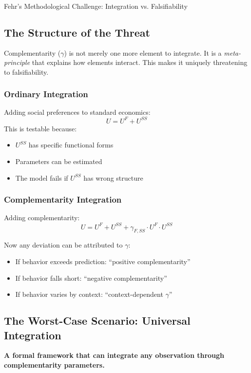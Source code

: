 \begin{chapter}{Fehr's Methodological Challenge: Integration vs. Falsifiability}
\subsection{The Structure of the Threat}

Complementarity ($\gamma$) is not merely one more element to integrate. It is a \textit{meta-principle} that explains how elements interact. This makes it uniquely threatening to falsifiability.

\subsubsection{Ordinary Integration}

Adding social preferences to standard economics:
\[
U = U^F + U^{SS}
\]
This is testable because:
\begin{itemize}[noitemsep]
    \item $U^{SS}$ has specific functional forms
    \item Parameters can be estimated
    \item The model fails if $U^{SS}$ has wrong structure
\end{itemize}

\subsubsection{Complementarity Integration}

Adding complementarity:
\[
U = U^F + U^{SS} + \gamma_{F,SS} \cdot U^F \cdot U^{SS}
\]

Now any deviation can be attributed to $\gamma$:
\begin{itemize}[noitemsep]
    \item If behavior exceeds prediction: ``positive complementarity''
    \item If behavior falls short: ``negative complementarity''
    \item If behavior varies by context: ``context-dependent $\gamma$''
\end{itemize}

\subsection{The Worst-Case Scenario: Universal Integration}

\begin{tcolorbox}[colback=red!10!white,colframe=red!75!black,title=\textbf{Fehr's Nightmare}]
\begin{center}
\textbf{A formal framework that can integrate any observation through complementarity parameters.}
\end{center}


\end{tcolorbox}
\end{chapter}
